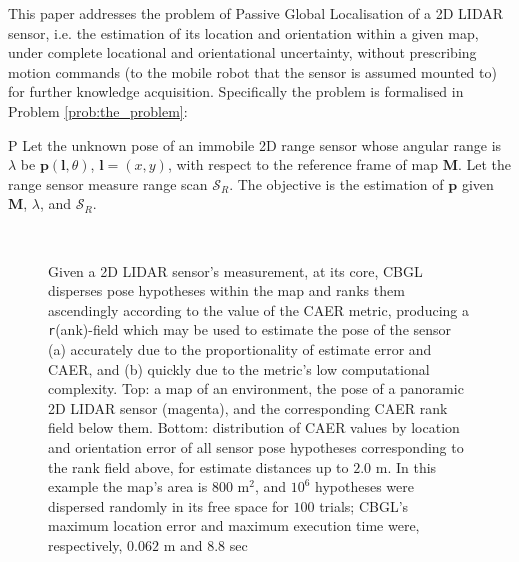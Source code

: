 This paper addresses the problem of Passive Global Localisation of a 2D LIDAR
sensor, i.e. the estimation of its location and orientation within a given map,
under complete locational and orientational uncertainty, without prescribing
motion commands (to the mobile robot that the sensor is assumed mounted to) for
further knowledge acquisition. Specifically the problem is formalised in
Problem \ref{prob:the_problem}:

\begin{customprb}{P}
  \label{prob:the_problem}
  Let the unknown pose of an immobile 2D range sensor whose angular range is
  $\lambda$ be $\bm{p}(\bm{l},\theta)$, $\bm{l} = (x,y)$, with respect to the
  reference frame of map $\bm{M}$. Let the range sensor measure range scan
  $\mathcal{S}_R$. The objective is the estimation of $\bm{p}$ given $\bm{M}$,
  $\lambda$, and $\mathcal{S}_R$.
\end{customprb}

\begin{figure}\vspace{0.4em}
  \subfloat{    \label{fig:a}} \vspace{-1.7cm}\\
  \subfloat{\hspace{-0.3cm} \label{fig:b}}
  \caption{\small
           Given a 2D LIDAR sensor's measurement, at its core, CBGL disperses
           pose hypotheses within the map and ranks them ascendingly according
           to the value of the CAER metric, producing a \texttt{r}(ank)-field
           which may be used to estimate the pose of the sensor (a) accurately
           due to the proportionality of estimate error and CAER, and (b)
           quickly due to the metric's low computational complexity.
           Top: a map of an environment, the pose of a panoramic 2D LIDAR sensor
           (magenta), and the corresponding CAER rank field below them.
           Bottom: distribution of CAER values by location and orientation
           error of all sensor pose hypotheses corresponding to the rank field
           above, for estimate distances up to $2.0$ m.
           In this example the map's area is $800$ m$^2$, and $10^6$ hypotheses
           were dispersed randomly in its free space for $100$ trials; CBGL's
           maximum location error and maximum execution time were,
           respectively, $0.062$ m and $8.8$ sec
           }
  \vspace{-0.75cm}
  \label{fig:face}
\end{figure}
